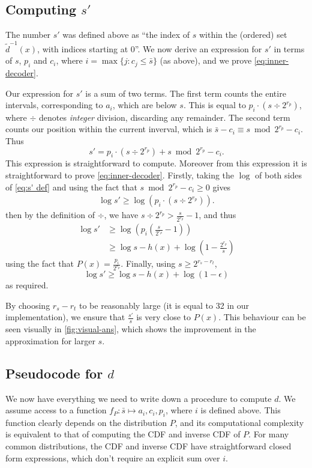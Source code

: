 \documentclass{article}
\begin{document}
\subsection{Computing \(s'\)}
The number \(s'\) was defined above as ``the index of \(s\) within the
(ordered) set \(\tilde d^{-1}(x)\), with indices starting at \(0\)''. We now
derive an expression for \(s'\) in terms of \(s\), \(p_i\) and \(c_i\), where
\(i = \max\{j: c_j \leq \bar s\}\) (as above), and we prove
\cref{eq:inner-decoder}.

Our expression for \(s'\) is a sum of two terms. The first term counts the
entire intervals, corresponding to \(a_i\), which are below \(s\). This is
equal to \(p_i \cdot (s \div 2^{r_p})\), where \(\div\) denotes \emph{integer}
division, discarding any remainder. The second term counts our position within
the current inverval, which is \(\bar s - c_i \equiv s\bmod 2^{r_p} - c_i\).
Thus
\begin{equation}\label{eq:s' def}
  s' = p_i \cdot (s \div 2^{r_p}) + s\bmod 2^{r_p} - c_i.
\end{equation}
This expression is straightforward to compute. Moreover from this expression it
is straightforward to prove \cref{eq:inner-decoder}. Firstly, taking the
\(\log\) of both sides of \cref{eq:s' def} and using the fact that \(s\bmod
2^{r_p} - c_i \geq 0\) gives
\begin{align}
  \log s' \geq \log (p_i\cdot (s\div 2^{r_p})).
\end{align}
then by the definition of \(\div\), we have \(s\div 2^{r_p} > \frac{s}{2^{r_p}}
- 1\), and thus
\begin{align}
  \log s'
    &\geq \log\left(p_i\left(\frac{s}{2^{r_p}} -1\right)\right)\\
    &\geq \log s - h(x) + \log\left(1 - \frac{2^{r_p}}{s}\right)
\end{align}
using the fact that \(P(x) = \frac{p_i}{2^{r_p}}\). Finally, using \(s \geq
2^{r_s - r_t}\),
\begin{equation}
  \log s' \geq \log s - h(x) + \log (1 - \epsilon)
\end{equation}
as required.

By choosing \(r_s - r_t\) to be reasonably
large (it is equal to 32 in our implementation), we ensure that
\(\frac{s'}{s}\) is very close to \(P(x)\). This behaviour can be seen visually
in \cref{fig:visual-ans}, which shows the improvement in the approximation for
larger \(s\).

\subsection{Pseudocode for \(d\)}
We now have everything we need to write down a procedure to compute \(d\). We
assume access to a function \(f_P:\bar{s}\mapsto a_i, c_i, p_i\), where \(i\)
is defined above. This function clearly depends on the distribution \(P\), and
its computational complexity is equivalent to that of computing the CDF and
inverse CDF of \(P\). For many common distributions, the CDF and inverse CDF
have straightforward closed form expressions, which don't require an explicit
sum over \(i\).
\end{document}
